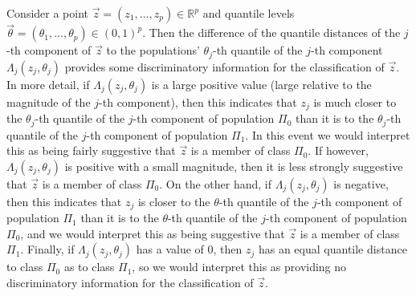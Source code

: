 Consider a point $\vec{z} = (z_1, \dots, z_p) \in \mathbb{R}^p$ and quantile
levels $\vec{\theta} = (\theta_1, \dots, \theta_p) \in (0, 1)^p$.  Then the
difference of the quantile distances of the $j$-th component of $\vec{z}$ to the
populations' $\theta_j$-th quantile of the $j$-th component
$\Lambda_j(z_j, \theta_j)$ provides some discriminatory information for the
classification of $\vec{z}$.  In more detail, if $\Lambda_j(z_j, \theta_j)$ is a
large positive value (large relative to the magnitude of the $j$-th component),
then this indicates that $z_j$ is much closer to the $\theta_j$-th quantile of
the $j$-th component of population $\Pi_0$ than it is to the $\theta_j$-th
quantile of the $j$-th component of population $\Pi_1$.  In this event we would
interpret this as being fairly suggestive that $\vec{z}$ is a member of class
$\Pi_0$.  If however, $\Lambda_j(z_j, \theta_j)$ is positive with a small
magnitude, then it is less strongly suggestive that $\vec{z}$ is a member of
class $\Pi_0$.  On the other hand, if $\Lambda_j(z_j, \theta_j)$ is negative,
then this indicates that $z_j$ is closer to the $\theta$-th quantile of the
$j$-th component of population $\Pi_1$ than it is to the $\theta$-th quantile of
the $j$-th component of population $\Pi_0$, and we would interpret this as being
suggestive that $\vec{z}$ is a member of class $\Pi_1$.  Finally, if
$\Lambda_j(z_j, \theta_j)$ has a value of 0, then $z_j$ has an equal quantile
distance to class $\Pi_0$ as to class $\Pi_1$, so we would interpret this as
providing no discriminatory information for the classification of $\vec{z}$.

